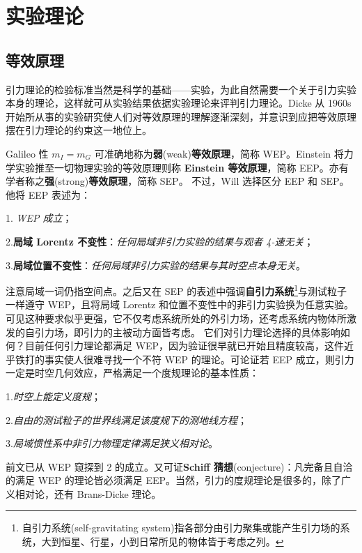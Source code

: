 \chapter{实验理论}\label{chpt:experiment}

\section{等效原理}\label{sec:eq-prin}



引力理论的检验标准当然是科学的基础——实验，为此自然需要一个关于引力实验本身的理论，这样就可从实验结果依据实验理论来评判引力理论。Dicke 从 1960s 开始所从事的实验研究使人们对等效原理的理解逐渐深刻，并意识到应把等效原理摆在引力理论的约束这一地位上。

Galileo 性 $m_I=m_G$ 可准确地称为\textbf{弱}(weak)\textbf{等效原理}，简称 WEP。Einstein 将力学实验推至一切物理实验的等效原理则称 \textbf{Einstein 等效原理}，简称 EEP。亦有学者称之\textbf{强}(strong)\textbf{等效原理}，简称 SEP。
不过，Will\cite{Will18} 选择区分 EEP 和 SEP。他将 EEP 表述为：

    1. \textit{WEP 成立}；

    2.\textbf{局域 Lorentz 不变性}：\textit{任何局域非引力实验的结果与观者 4-速无关}；
    
    3.\textbf{局域位置不变性}：\textit{任何局域非引力实验的结果与其时空点本身无关}。

\noindent 注意局域一词仍指空间点。之后又在 SEP 的表述中强调\textbf{自引力系统}\footnote{自引力系统(self-gravitating system)指各部分由引力聚集或能产生引力场的系统，大到恒星、行星，小到日常所见的物体皆于考虑之列。}与测试粒子一样遵守 WEP，且将局域 Lorentz 和位置不变性中的非引力实验换为任意实验。可见这种要求似乎更强，它不仅考虑系统所处的外引力场，还考虑系统内物体所激发的自引力场，即引力的主被动方面皆考虑。
它们对引力理论选择的具体影响如何？目前任何引力理论都满足 WEP，因为验证很早就已开始且精度较高，这件近乎铁打的事实使人很难寻找一个不符 WEP 的理论。可论证若 EEP 成立，则引力一定是时空几何效应，严格满足一个度规理论的基本性质：

1.\textit{时空上能定义度规}；

2.\textit{自由的测试粒子的世界线满足该度规下的测地线方程}；

3.\textit{局域惯性系中非引力物理定律满足狭义相对论}。

\noindent 前文已从 WEP 窥探到 2 的成立。又可证\textbf{Schiff 猜想}(conjecture)：凡完备且自洽的满足 WEP 的理论皆必须满足 EEP。当然，引力的度规理论是很多的，除了广义相对论，还有 Brans-Dicke 理论。

